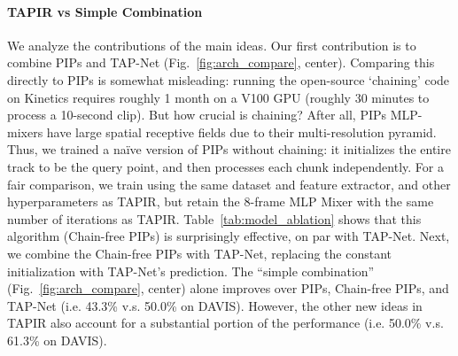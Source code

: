 \documentclass[10pt,twocolumn,letterpaper]{article}
\begin{document}
\paragraph{TAPIR vs Simple Combination} We analyze the contributions of the main ideas.  Our first contribution is to combine PIPs and TAP-Net (Fig.~\ref{fig:arch_compare}, center). Comparing this directly to PIPs is somewhat misleading:  running the open-source `chaining' code on Kinetics requires roughly 1 month on a V100 GPU (roughly 30 minutes to process a 10-second clip).  But how crucial is chaining?  After all, PIPs MLP-mixers have large spatial receptive fields due to their multi-resolution pyramid.  Thus, we trained a na\"ive version of PIPs without chaining: it initializes the entire track to be the query point, and then processes each chunk independently.  For a fair comparison, we train using the same dataset and feature extractor, and other hyperparameters as TAPIR, but retain the 8-frame MLP Mixer with the same number of iterations as TAPIR.  Table~\ref{tab:model_ablation} shows that this algorithm (Chain-free PIPs) is surprisingly effective, on par with TAP-Net. Next, we combine the Chain-free PIPs with TAP-Net, replacing the constant initialization with TAP-Net's prediction. The ``simple combination'' (Fig.~\ref{fig:arch_compare}, center) alone improves over PIPs, Chain-free PIPs, and TAP-Net (i.e. 43.3\% v.s. 50.0\% on DAVIS).  However, the other new ideas in TAPIR also account for a substantial portion of the performance (i.e. 50.0\% v.s. 61.3\% on DAVIS).

\begin{table}[t]
\caption{\textbf{PIPs, TAP-Net, and a simple combination vs TAPIR.} We compare TAPIR (Fig. \ref{fig:arch_compare} right) to TAP-Net, PIPs (Fig. \ref{fig:arch_compare} left), and the ``simple combination'' (Fig. \ref{fig:arch_compare} center).  Chain-Free PIPs is our reimplementation of PIPs that removes the extremely slow chaining operation and uses the TAPIR backbone network.  All models in this table are trained on Panning MOVi-E except PIPs, which uses its own dataset.}
\label{tab:model_ablation}
\end{table}
\end{document}
